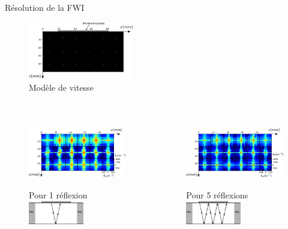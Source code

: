 \begin{frame}{Résolution de la FWI}
	\begin{figure}
		\includegraphics[height=2.5cm]{img/vp_scat.png}\\
		\vspace{-0.3cm} \small{Modèle de vitesse}
	\end{figure}
	\vspace{-0.6cm} 
	\begin{columns}
		\begin{figure}
			\includegraphics[height=3cm]{img/1400pt.png}\\
			\small{Pour 1 réflexion}\\[0.3cm]
			\includegraphics[height=1cm]{img/1ref.png}
		\end{figure}
		\begin{figure}
			\includegraphics[height=3cm]{img/4200pt.png}\\
			\small{Pour 5 réflexions}\\[0.3cm]
			\includegraphics[height=1cm]{img/6ref.png}
		\end{figure}
	\end{columns}

\end{frame}

